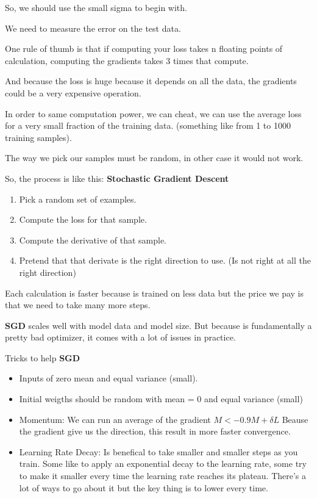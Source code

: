 \documentclass[11pt, a4paper]{article}
\begin{document}
So, we should use the small sigma to begin with. 

We need to measure the error on the test data. 

One rule of thumb is that if computing your loss takes n floating points of calculation, computing the gradients takes 3 times that compute. 

And because the loss is huge because it depends on all the data, the gradients could be a very expensive operation. 

In order to same computation power, we can cheat, we can use the average loss for a very small fraction of the training data. (something like from 1 to 1000 training samples). 

The way we pick our samples must be random, in other case it would not work. 

So, the process is like this: \textbf{Stochastic Gradient Descent} 
\begin{enumerate}
	\item Pick a random set of examples. 
	\item Compute the loss for that sample.
	\item Compute the derivative of that sample.
	\item Pretend that that derivate is the right direction to use. (Is not right at all the right direction)
\end{enumerate}

Each calculation is faster because is trained on less data but the price we pay is that we need to take many more steps. 

\textbf{SGD} scales well with model data and model size. But because is fundamentally a pretty bad optimizer, it comes with a lot of issues in practice. 


Tricks to help \textbf{SGD} 
\begin{itemize}
\item Inputs of zero mean and equal variance (small).
\item Initial weigths should be random with mean = 0 and equal variance (small)
\item Momentum: We can run an average of the gradient $M <- 0.9M + \delta L$  Beause the gradient give us the direction, this result in more faster convergence. 
\item Learning Rate Decay: Is benefical to take smaller and smaller steps as you train. Some like to apply an exponential decay to the learning rate, some try to make it smaller every time the learning rate reaches its plateau. There's a lot of ways to go about it but the key thing is to lower every time.
\end{itemize}
\end{document}
